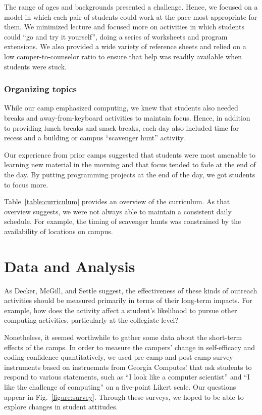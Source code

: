 The range of ages and backgrounds presented a challenge.  Hence,
we focused on a model in which each pair of students could work at the
pace most appropriate for them.  We minimized lecture and focused more
on activities in which students could ``go and try it yourself'', doing
a series of worksheets and program extensions.  We also provided a wide
variety of reference sheets and relied on a low camper-to-counselor
ratio to ensure that help was readily available when students were stuck.

\subsubsection{Organizing topics}

While our camp emphasized computing, we knew that students also
needed breaks and away-from-keyboard activities to maintain focus.
Hence, in addition to providing lunch breaks and snack breaks, each
day also included time for recess and a building or campus ``scavenger
hunt'' activity.

Our experience from prior camps suggested that students were most
amenable to learning new material in the morning and that focus
tended to fade at the end of the day.  By putting programming
projects at the end of the day, we got students to focus more.

Table~\ref{table:curriculum} provides an overview of the curriculum.
As that overview suggests, we were not always able to maintain a
consistent daily schedule.  For example, the timing of scavenger
hunts was constrained by the availability of locations on campus.

\section{Data and Analysis}

As Decker, McGill, and Settle \cite{Decker2016,McGill2015}
suggest, the effectiveness of these kinds of outreach activities
should be measured primarily in terms of their long-term impacts.
For example,
how does the activity affect a student's likelihood to pursue other
computing activities, particularly at the collegiate level?

Nonetheless, it seemed worthwhile to gather some data
about the short-term effects of the camps.  In order to measure the campers'
change in self-efficacy and coding confidence quantitatively,
we used pre-camp and post-camp survey instruments based on
instruemnts from Georgia Computes! \cite{Bruckman2009} that ask
students to respond to various statements, such as ``I look like a
computer scientist'' and ``I like the challenge of computing'' on
a five-point Likert scale.  Our questions appear in
Fig.~\ref{figure:survey}.  Through these surveys, we hoped to be
able to explore changes in student attitudes.

